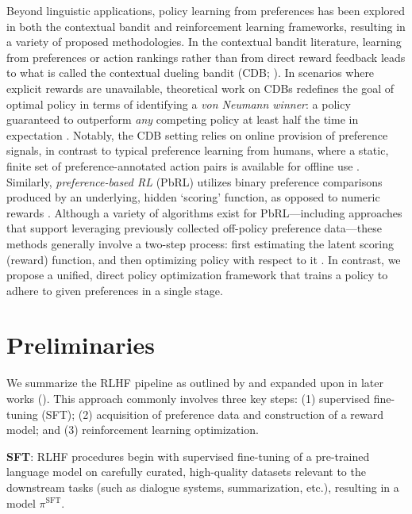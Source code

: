 Beyond linguistic applications, policy learning from preferences has been explored in both the contextual bandit and reinforcement learning frameworks, resulting in a variety of proposed methodologies. In the contextual bandit literature, learning from preferences or action rankings rather than from direct reward feedback leads to what is called the contextual dueling bandit (CDB; \cite{yue2012karmed,dudik2015contextual}). In scenarios where explicit rewards are unavailable, theoretical work on CDBs redefines the goal of optimal policy in terms of identifying a \textit{von Neumann winner}: a policy guaranteed to outperform \textit{any} competing policy at least half the time in expectation \citep{dudik2015contextual}. Notably, the CDB setting relies on online provision of preference signals, in contrast to typical preference learning from humans, where a static, finite set of preference-annotated action pairs is available for offline use \citep{yan2022human}. Similarly, \textit{preference-based RL} (PbRL) utilizes binary preference comparisons produced by an underlying, hidden `scoring' function, as opposed to numeric rewards \citep{BusaFekete2014,ruiz2023dueling}. Although a variety of algorithms exist for PbRL—including approaches that support leveraging previously collected off-policy preference data—these methods generally involve a two-step process: first estimating the latent scoring (reward) function, and then optimizing policy with respect to it \citep{jain2013learning,BusaFekete2014,christiano2017deep,sadigh2017active,kupcsik2018learning}. In contrast, we propose a unified, direct policy optimization framework that trains a policy to adhere to given preferences in a single stage.

\section{Preliminaries}\label{section:prelims}

We summarize the RLHF pipeline as outlined by \citeauthor{ziegler2020finetuning} and expanded upon in later works (\citep{stiennon2022learning, bai2022training, ouyang2022training}). This approach commonly involves three key steps: (1) supervised fine-tuning (SFT); (2) acquisition of preference data and construction of a reward model; and (3) reinforcement learning optimization.

\textbf{SFT}: RLHF procedures begin with supervised fine-tuning of a pre-trained language model on carefully curated, high-quality datasets relevant to the downstream tasks (such as dialogue systems, summarization, etc.), resulting in a model $\pi^\text{SFT}$.

